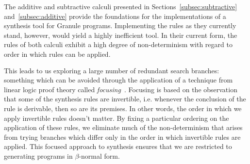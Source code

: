 The additive and subtractive calculi presented in
Sections~\ref{subsec:subtractive} and~\ref{subsec:additive} provide the
foundations for the implementations of a synthesis tool for Granule programs.
Implementing the rules as they currently stand, however, would yield a highly
inefficient tool. In their current form, the rules of both calculi exhibit a
high degree of non-determinism with regard to order in which rules
can be applied. 


This leads to us exploring a large number of redundant search branches:
something which can be avoided through the application of a technique from
linear logic proof theory called \textit{focusing}~\citep{focusing}. Focusing is
based on the observation that some of the synthesis rules are invertible, i.e.
whenever the conclusion of the rule is derivable, then so are its premises. In
other words, the order in which we apply invertible rules doesn't matter. By
fixing a particular ordering on the application of these rules, we eliminate
much of the non-determinism that arises from trying branches which differ only
in the order in which invertible rules are applied. This focused approach to
synthesis ensures that we are restricted to generating programs in
$\beta$-normal form.

